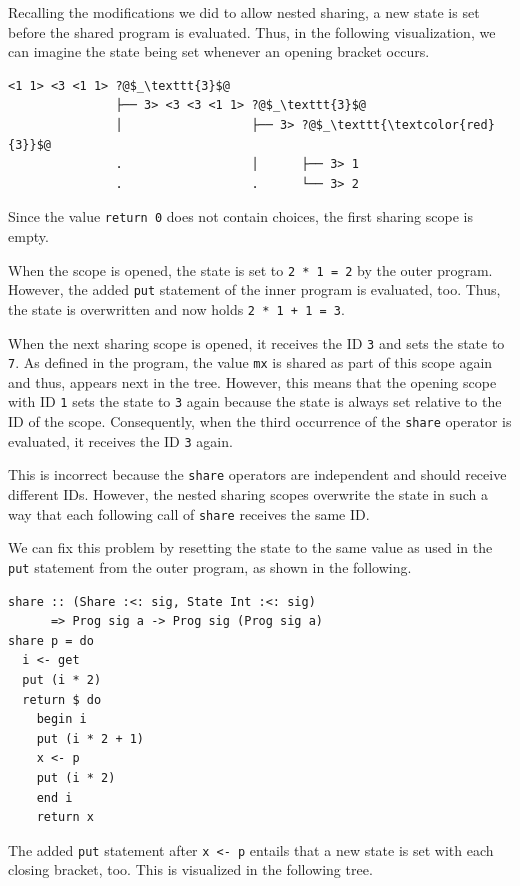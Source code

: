 \documentclass[a4paper, 11pt, fleqn, twoside, abstract=on]{scrreprt}
\newcommand{\hinl}[1]{\texttt{#1}}
\newcommand{\cinl}[1]{\texttt{#1}}
\begin{document}
Recalling the modifications we did to allow nested sharing, a new state is set before the shared program is evaluated.
Thus, in the following visualization, we can imagine the state being set whenever an opening bracket occurs.
\pagebreak
\begin{verbatim}
<1 1> <3 <1 1> ?@$_\texttt{3}$@ 
               ├── 3> <3 <3 <1 1> ?@$_\texttt{3}$@
               │                  ├── 3> ?@$_\texttt{\textcolor{red}{3}}$@
               .                  │      ├── 3> 1
               .                  .      └── 3> 2
\end{verbatim}
\noindent
Since the value \hinl{return 0} does not contain choices, the first sharing scope is empty.

When the scope is opened, the state is set to \hinl{2 * 1 = 2} by the outer program.
However, the added \hinl{put} statement of the inner program is evaluated, too.
Thus, the state is overwritten and now holds \hinl{2 * 1 + 1 = 3}.

When the next sharing scope is opened, it receives the ID \hinl{3} and sets the state to \hinl{7}.
As defined in the program, the value \hinl{mx} is shared as part of this scope again and thus, appears next in the tree.
However, this means that the opening scope with ID \hinl{1} sets the state to \hinl{3} again because the state is always set relative to the ID of the scope.
Consequently, when the third occurrence of the \hinl{share} operator is evaluated, it receives the ID \hinl{3} again.

This is incorrect because the \hinl{share} operators are independent and should receive different IDs.
However, the nested sharing scopes overwrite the state in such a way that each following call of \cinl{share} receives the same ID.

We can fix this problem by resetting the state to the same value as used in the \hinl{put} statement from the outer program, as shown in the following.

\begin{verbatim}
share :: (Share :<: sig, State Int :<: sig) 
      => Prog sig a -> Prog sig (Prog sig a)
share p = do
  i <- get
  put (i * 2)
  return $ do
    begin i
    put (i * 2 + 1)
    x <- p
    put (i * 2)
    end i
    return x
\end{verbatim}

The added \hinl{put} statement after \hinl{x <- p} entails that a new state is set with each closing bracket, too.
This is visualized in the following tree.
\end{document}
